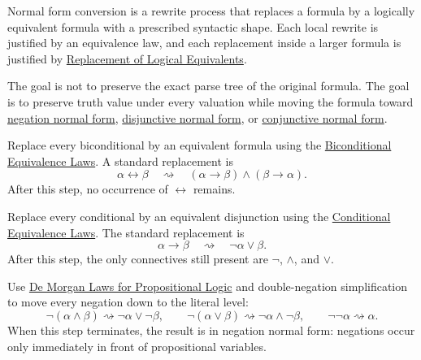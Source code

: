 \begin{remark*}
Normal form conversion is a rewrite process that replaces a formula by a
logically equivalent formula with a prescribed syntactic shape. Each local
rewrite is justified by an equivalence law, and each replacement inside a
larger formula is justified by
\hyperref[thm:replacement-of-logical-equivalents-propositional-logic]{Replacement of Logical Equivalents}.

The goal is not to preserve the exact parse tree of the original formula. The
goal is to preserve truth value under every valuation while moving the formula
toward
\hyperref[def:negation-normal-form-propositional-logic]{negation normal form},
\hyperref[def:disjunctive-normal-form-propositional-logic]{disjunctive normal form},
or
\hyperref[def:conjunctive-normal-form-propositional-logic]{conjunctive normal form}.
\end{remark*}

\begin{remark*}
Replace every biconditional by an equivalent formula using the
\hyperref[thm:biconditional-equivalence-laws-propositional-logic]{Biconditional Equivalence Laws}.
A standard replacement is
\[
\alpha\leftrightarrow\beta
\quad\rightsquigarrow\quad
(\alpha\rightarrow\beta)\land(\beta\rightarrow\alpha).
\]
After this step, no occurrence of \(\leftrightarrow\) remains.
\end{remark*}

\begin{remark*}
Replace every conditional by an equivalent disjunction using the
\hyperref[thm:conditional-equivalence-laws-propositional-logic]{Conditional Equivalence Laws}.
The standard replacement is
\[
\alpha\rightarrow\beta
\quad\rightsquigarrow\quad
\neg\alpha\lor\beta.
\]
After this step, the only connectives still present are \(\neg\), \(\land\),
and \(\lor\).
\end{remark*}

\begin{remark*}
Use
\hyperref[thm:de-morgan-laws-propositional-logic]{De Morgan Laws for Propositional Logic}
and double-negation simplification to move every negation down to the literal
level:
\[
\neg(\alpha\land\beta)\rightsquigarrow \neg\alpha\lor\neg\beta,
\qquad
\neg(\alpha\lor\beta)\rightsquigarrow \neg\alpha\land\neg\beta,
\qquad
\neg\neg\alpha\rightsquigarrow \alpha.
\]
When this step terminates, the result is in negation normal form: negations
occur only immediately in front of propositional variables.
\end{remark*}

